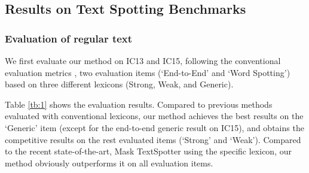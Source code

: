 \documentclass[letterpaper]{article} \usepackage{aaai21}  \usepackage{times}  \usepackage{helvet} \usepackage{courier}  \usepackage[hyphens]{url}  \usepackage{graphicx} \urlstyle{rm} \def\UrlFont{\rm}  \usepackage{natbib}  \usepackage{caption} \frenchspacing  \setlength{\pdfpagewidth}{8.5in}  \setlength{\pdfpageheight}{11in}  \usepackage{multirow}
\begin{document}
\subsection{Results on Text Spotting Benchmarks}
\subsubsection{Evaluation of regular text}
We first evaluate our method on IC13 and IC15, following the conventional evaluation metrics \cite{karatzas2015icdar}, two evaluation items (`End-to-End' and `Word Spotting') based on three different lexicons (Strong, Weak, and Generic).

Table \ref{tb:1} shows the evaluation results.
Compared to previous methods evaluated with conventional lexicons, our method achieves the best results on the `Generic' item (except for the end-to-end generic result on IC15), and obtains the competitive results on the rest evaluated items (`Strong' and `Weak').
Compared to the recent state-of-the-art, Mask TextSpotter \cite{liao2019mask} using the specific lexicon, our method obviously outperforms it on all evaluation items.
\end{document}
